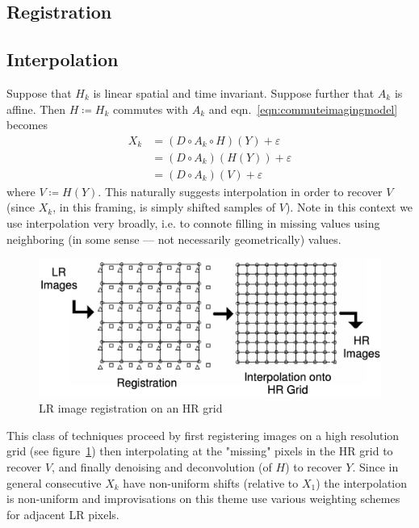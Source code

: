 \newcommand*{\bx}{\bm{x}}
\newcommand*{\bX}{\bm{X}}
\newcommand*{\bxi}{\bm{x}_i}
\newcommand*{\delx}{\bx - \bxi}
\newcommand*{\by}{\bm{y}}
\newcommand*{\byi}{\bm{y}_i}
\newcommand*{\dely}{\by - \byi}
\newcommand*{\zbx}{Z(\bx)}
\newcommand*{\zbxi}{Z(\bxi)}
\newcommand*{\bb}{\bm{\beta}}
\newcommand*{\hzbx}{\hat{Z}(\bx)}
\newcommand*{\etal}{\textit{et al. }}

%
\subsection{Registration}\label{subsec:registration}
\subsection{Interpolation}\label{subsec:interpolation}
Suppose that $H_k$ is linear spatial and time invariant.
%
Suppose further that $A_k$ is affine.
%
Then $H \coloneqq H_k$ commutes with $A_k$\cite{meladcommute} and eqn.~\ref{eqn:commuteimagingmodel} becomes
\begin{equation}
    \label{eqn:commuteimagingmodel}
    \begin{split}
        X_k &= (D \circ A_k \circ H) (Y) + \varepsilon \\
        &= (D \circ A_k) (H(Y)) + \varepsilon \\
        &= (D \circ A_k) (V) + \varepsilon
    \end{split}
\end{equation}
%
where $V \coloneqq H(Y)$.
%
This naturally suggests interpolation in order to recover $V$ (since $X_k$, in this framing, is simply shifted samples of $V$).
%
Note in this context we use interpolation very broadly, i.e. to connote filling in missing values using neighboring (in some sense --- not necessarily geometrically) values.
%
\begin{figure}
    \centering
    \includegraphics[width=\linewidth,keepaspectratio]{figures/hrgrid.png}
    \caption{LR image registration on an HR grid\cite{Lin}}
    \label{fig:hrgrid}
\end{figure}
This class of techniques proceed by first registering images on a high resolution grid (see figure~\ref{fig:hrgrid}) then interpolating at the "missing" pixels in the HR grid to recover $V$, and finally denoising and deconvolution (of $H$) to recover $Y$.
%
Since in general consecutive $X_k$ have non-uniform shifts (relative to $X_1$) the interpolation is non-uniform and improvisations on this theme use various weighting schemes for adjacent LR pixels.

